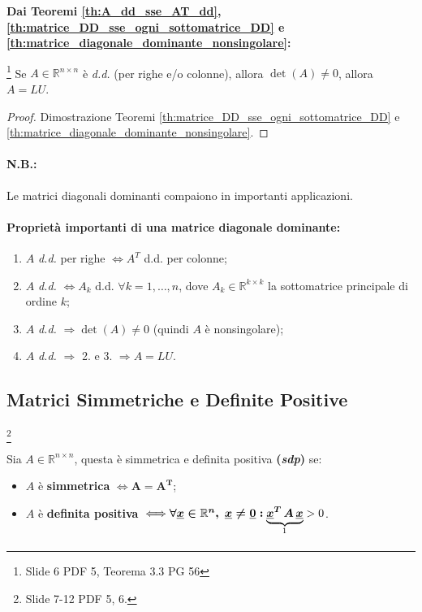 
\noindent \textbf{Dai Teoremi \ref{th:A_dd_sse_AT_dd}, \ref{th:matrice_DD_sse_ogni_sottomatrice_DD} e \ref{th:matrice_diagonale_dominante_nonsingolare}:}
\begin{corollary}\label{cor:matrice_diagonale_dominante_LU}\footnote{Slide 6 PDF 5, Teorema 3.3 PG 56}
    Se $A\in\mathbb{R}^{n\times n}$ è \textit{d.d.} (per righe e/o colonne), allora $\det(A)\neq 0$, allora $A=LU$.
\end{corollary}
\begin{proof}
	Dimostrazione Teoremi \ref{th:matrice_DD_sse_ogni_sottomatrice_DD} e \ref{th:matrice_diagonale_dominante_nonsingolare}.
\end{proof}

\paragraph{N.B.:}Le matrici diagonali dominanti compaiono in importanti applicazioni.

\paragraph{Proprietà importanti di una matrice diagonale dominante:}
\begin{enumerate}
	\item $A$ \textit{d.d.} per righe $\iff A^T$ d.d. per colonne;
	\item $A$ \textit{d.d.} $\iff A_k$ d.d. $\forall k=1,\hdots, n$, dove $A_k\in\mathbb{R}^{k\times k}$ la sottomatrice principale di ordine $k$;
	\item $A$ \textit{d.d.} $\Rightarrow\det(A)\neq 0$ (quindi $A$ è nonsingolare);
	\item $A$ \textit{d.d.} $\Rightarrow$ 2. e 3. $\Rightarrow A=LU$.
\end{enumerate}

\subsection{Matrici Simmetriche e Definite Positive}\label{ssec:matrice_SDP_fattorizzabile_LDL}\footnote{Slide 7-12 PDF 5, 6.}
\begin{definition}
    Sia $A\in\mathbb R^{n\times n}$, questa è simmetrica e definita positiva \textbf{(\textit{sdp})} se:
    \begin{itemize}
        \item $A$ è \textbf{simmetrica} $\iff \boldsymbol{A=A^T}$;
        \item $A$ è \textbf{definita positiva} $\iff\boldsymbol{\forall\uline x\in\mathbb R^n,\; \uline x\neq \uline 0:} \underbrace{\boldsymbol{\uline x^T\, A\, \uline x}}_{\footnotemark}>0$.
    \end{itemize}
\end{definition}

